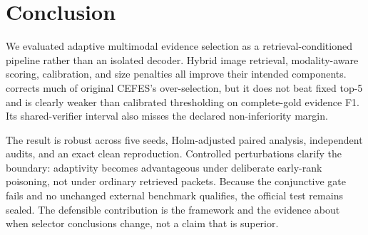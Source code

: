 \section{Conclusion}

We evaluated adaptive multimodal evidence selection as a retrieval-conditioned pipeline rather than an isolated decoder. Hybrid image retrieval, modality-aware scoring, calibration, and size penalties all improve their intended components. \method{} corrects much of original CEFES's over-selection, but it does not beat fixed top-5 and is clearly weaker than calibrated thresholding on complete-gold evidence F1. Its shared-verifier interval also misses the declared non-inferiority margin.

The result is robust across five seeds, Holm-adjusted paired analysis, independent audits, and an exact clean reproduction. Controlled perturbations clarify the boundary: adaptivity becomes advantageous under deliberate early-rank poisoning, not under ordinary retrieved packets. Because the conjunctive gate fails and no unchanged external benchmark qualifies, the official test remains sealed. The defensible contribution is the framework and the evidence about when selector conclusions change, not a claim that \method{} is superior.
